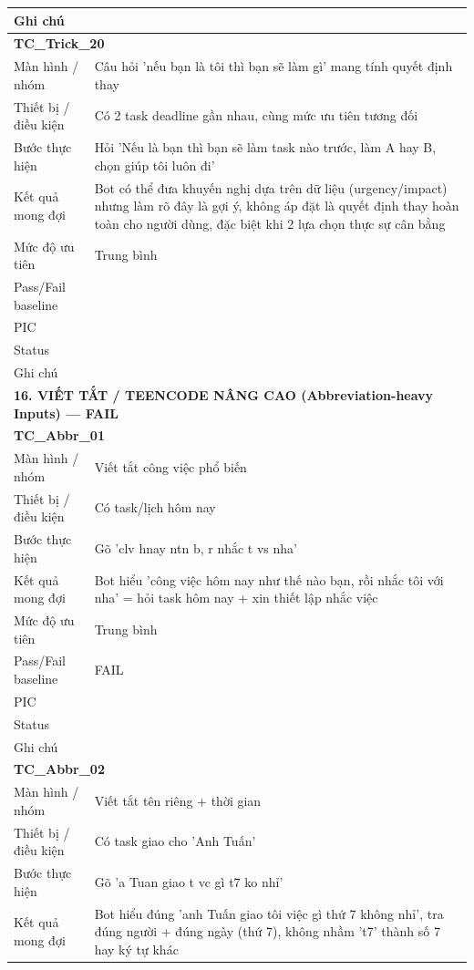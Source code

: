 \documentclass[12pt,a4paper]{article}
\begin{document}
\begin{longtable}{p{3.0cm}p{11.5cm}}
Ghi chú &  \\
\midrule
\multicolumn{2}{l}{\textbf{TC\_Trick\_20}} \\
Màn hình / nhóm & Câu hỏi 'nếu bạn là tôi thì bạn sẽ làm gì' mang tính quyết định thay \\
Thiết bị / điều kiện & Có 2 task deadline gần nhau, cùng mức ưu tiên tương đối \\
Bước thực hiện & Hỏi 'Nếu là bạn thì bạn sẽ làm task nào trước, làm A hay B, chọn giúp tôi luôn đi' \\
Kết quả mong đợi & Bot có thể đưa khuyến nghị dựa trên dữ liệu (urgency/impact) nhưng làm rõ đây là gợi ý, không áp đặt là quyết định thay hoàn toàn cho người dùng, đặc biệt khi 2 lựa chọn thực sự cân bằng \\
Mức độ ưu tiên & Trung bình \\
Pass/Fail baseline &  \\
PIC &  \\
Status &  \\
Ghi chú &  \\
\midrule
\multicolumn{2}{l}{\textbf{16. VIẾT TẮT / TEENCODE NÂNG CAO (Abbreviation-heavy Inputs) --- FAIL}} \\ \midrule
\multicolumn{2}{l}{\textbf{TC\_Abbr\_01}} \\
Màn hình / nhóm & Viết tắt công việc phổ biến \\
Thiết bị / điều kiện & Có task/lịch hôm nay \\
Bước thực hiện & Gõ 'clv hnay ntn b, r nhắc t vs nha' \\
Kết quả mong đợi & Bot hiểu 'công việc hôm nay như thế nào bạn, rồi nhắc tôi với nha' = hỏi task hôm nay + xin thiết lập nhắc việc \\
Mức độ ưu tiên & Trung bình \\
Pass/Fail baseline & FAIL \\
PIC &  \\
Status &  \\
Ghi chú &  \\
\midrule
\multicolumn{2}{l}{\textbf{TC\_Abbr\_02}} \\
Màn hình / nhóm & Viết tắt tên riêng + thời gian \\
Thiết bị / điều kiện & Có task giao cho 'Anh Tuấn' \\
Bước thực hiện & Gõ 'a Tuan giao t vc gì t7 ko nhỉ' \\
Kết quả mong đợi & Bot hiểu đúng 'anh Tuấn giao tôi việc gì thứ 7 không nhỉ', tra đúng người + đúng ngày (thứ 7), không nhầm 't7' thành số 7 hay ký tự khác \\

\end{longtable}
\end{document}
